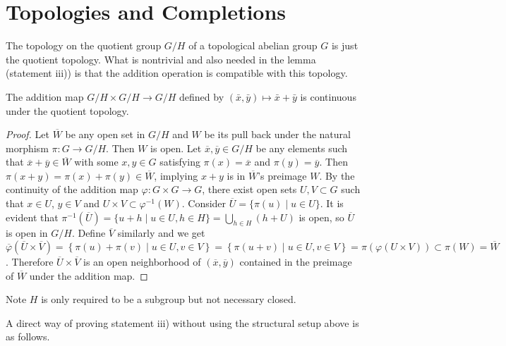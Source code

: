 \documentclass{note}
\begin{document}
\section*{Topologies and Completions}

The topology on the quotient group $G/H$ of a topological abelian group $G$ is
just the quotient topology. What is nontrivial and also needed in the lemma
(statement iii)) is that the addition operation is compatible with this
topology.

\begin{lemma*}
  The addition map $G/H \times G/H \to G/H$ defined by $(\bar{x},\bar{y}) \mapsto
    \bar{x}+\bar{y}$ is continuous under the quotient topology.
\end{lemma*}

\begin{proof}
  Let $\overline{W}$ be any open set in $G/H$ and $W$ be its pull back under the
  natural morphism $\pi\colon G \to G/H$. Then $W$ is open. Let $\overline{x},
    \overline{y} \in G/H$ be any elements such that $\overline{x} + \overline{y}
    \in \overline{W}$ with some $x, y \in G$ satisfying $\pi(x) = \overline{x}$ and
  $\pi(y) = \overline{y}$. Then $\pi(x + y) = \pi(x) + \pi(y) \in
    \overline{W}$,
  implying $x + y$ is in $\overline{W}$'s preimage $W$. By the continuity of the
  addition map $\varphi\colon G \times G \to G$, there exist open sets $U,V
    \subset G$ such that $x\in U$, $y\in V$ and $U\times V \subset
    \varphi^{-1}(W)$. Consider $\overline{U} = \{\pi(u) \mid u \in U\}$. It is
  evident that $\pi^{-1}\left(\overline{U}\right) = \{u+h \mid u \in U, h \in H\}
    = \bigcup_{h\in H}(h+U)$ is open, so $\overline{U}$ is open in $G/H$. Define
  $\overline{V}$ similarly and we get
  $\overline\varphi\left(\overline{U}\times\overline{V}\right) =
    \left\{\pi(u)+\pi(v) \mid u\in U, v\in
    V\right\} = \left\{\pi(u+v) \mid u\in U,
    v\in V\right\} = \pi\left(\varphi\left(U\times V\right)\right) \subset \pi(W) =
    \overline{W}$. Therefore $\overline{U} \times \overline{V}$ is an open
  neighborhood of $\left(\overline{x}, \overline{y}\right)$ contained in the
  preimage of $\overline{W}$ under the addition map.
\end{proof}

\begin{remark*}
  Note $H$ is only required to be a subgroup but not necessary closed.
\end{remark*}

A direct way of proving statement iii) without using the structural setup above
is as follows.
\end{document}
